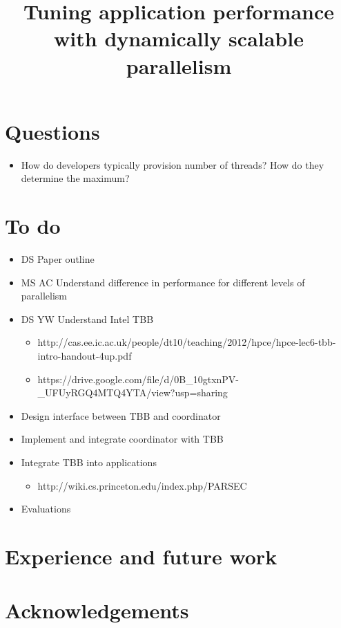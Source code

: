 \documentclass[10pt,preprint]{sigplanconf}
\date{}
\begin{document}
\title{Tuning application performance with dynamically scalable parallelism}
\maketitle



\section{Questions}
\begin{itemize}
  \item How do developers typically provision number of threads? How do they determine the maximum?
\end{itemize}

\section{To do}
\begin{itemize}
  \item DS Paper outline
  \item MS AC Understand difference in performance for different levels of parallelism
  \item DS YW Understand Intel TBB
  \begin{itemize}
    \item http://cas.ee.ic.ac.uk/people/dt10/teaching/2012/hpce/hpce-lec6-tbb-intro-handout-4up.pdf
    \item https://drive.google.com/file/d/0B\_10gtxnPV-\_UFUyRGQ4MTQ4YTA/view?usp=sharing
  \end{itemize}
  \item Design interface between TBB and coordinator
  \item Implement and integrate coordinator with TBB
  \item Integrate TBB into applications
  \begin{itemize}
    \item http://wiki.cs.princeton.edu/index.php/PARSEC
  \end{itemize}
  \item Evaluations
\end{itemize}











\section{Experience and future work}

\section*{Acknowledgements}

{}

\end{document}
